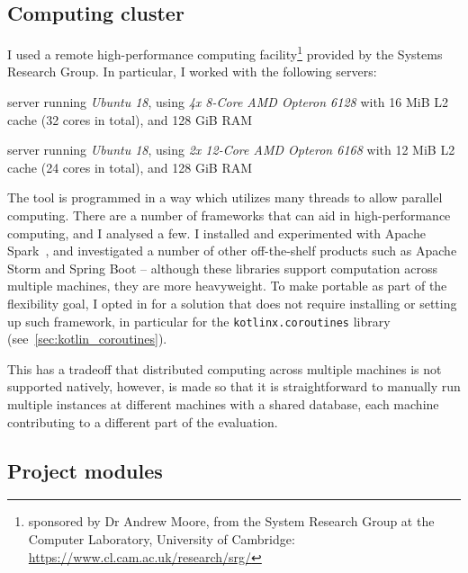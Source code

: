 \subsection{Computing cluster}\label{sec:computing_cluster}

I used a remote high-performance computing facility\footnote{sponsored by Dr Andrew Moore, from the System Research Group at the Computer Laboratory, University of Cambridge: \url{https://www.cl.cam.ac.uk/research/srg/}} provided by the Systems Research Group.
In particular, I worked with the following servers:

\begin{description}[itemsep=-4pt]
    \item[\texttt{rio.cl.cam.ac.uk}] server running \textsl{Ubuntu 18}, using \textsl{4x 8-Core AMD Opteron 6128} with 16 MiB L2 cache (32 cores in total), and 128 GiB RAM
    \item[\texttt{nile.cl.cam.ac.uk}] server running \textsl{Ubuntu 18}, using \textsl{2x 12-Core AMD Opteron 6168} with 12 MiB L2 cache (24 cores in total), and 128 GiB RAM
\end{description}

The \graffs tool is programmed in a way which utilizes many threads to allow parallel computing.
There are a number of frameworks that can aid in high-performance computing, and I analysed a few.
I installed and experimented with Apache Spark~\cite{ZahariaApacheSparkUnified2016}, and investigated a number of other off-the-shelf products such as Apache Storm and Spring Boot -- although these libraries support computation across multiple machines, they are more heavyweight.
To make \graffs portable as part of the flexibility goal, I opted in for a solution that does not require installing or setting up such framework, in particular for the \texttt{kotlinx.coroutines} library~\cite{TorresLearningConcurrencyKotlin2018} (see~\autoref{sec:kotlin_coroutines}).

This has a tradeoff that distributed computing across multiple machines is not supported natively, however, \graffs is made so that it is straightforward to manually run multiple instances at different machines with a shared database, each machine contributing to a different part of the evaluation.

\subsection{Project modules}



